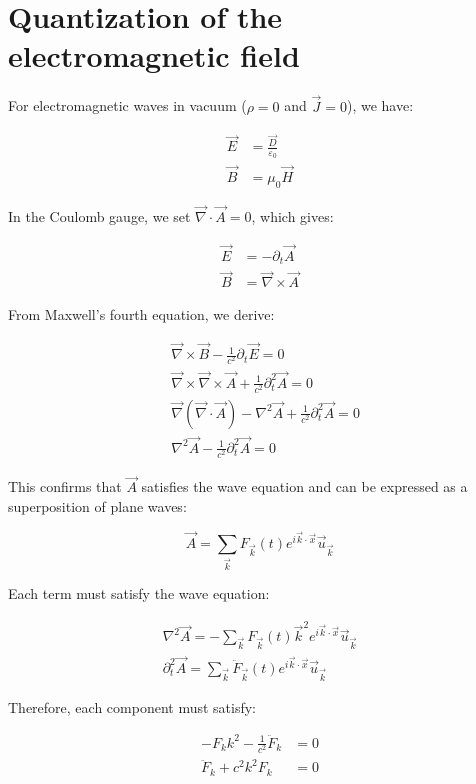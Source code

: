 \chapter{Quantization of the electromagnetic field}
For electromagnetic waves in vacuum ($\rho=0$ and $\vec{J}=0$), we have:

\begin{align}
\vec{E}&=\frac{\vec{D}}{\varepsilon_0} \\
\vec{B}&=\mu_0\vec{H}
\end{align}

In the Coulomb gauge, we set $\vec{\nabla}\cdot\vec{A}=0$, which gives:

\begin{align}
\vec{E}&=-\partial_t\vec{A}\\
\vec{B}&=\vec{\nabla}\times\vec{A}
\end{align}

From Maxwell's fourth equation, we derive:

\begin{align}
&\vec{\nabla}\times\vec{B}-\frac{1}{c^2}\partial_t\vec{E}=0\\
&\vec{\nabla}\times\vec{\nabla}\times\vec{A}+\frac{1}{c^2}\partial_t^2\vec{A}=0\\
&\vec{\nabla}(\vec{\nabla}\cdot\vec{A})-\nabla^2\vec{A}+\frac{1}{c^2}\partial_t^2\vec{A}=0 \\
&\nabla^2\vec{A}-\frac{1}{c^2}\partial_t^2\vec{A}=0
\end{align}

This confirms that $\vec{A}$ satisfies the wave equation and can be expressed as a superposition of plane waves:

\begin{equation}
\vec{A}=\sum_{\vec{k}}F_{\vec{k}}(t)e^{i\vec{k}\cdot\vec{x}}\vec{u}_{\vec{k}}
\end{equation}

Each term must satisfy the wave equation:

\[
\begin{array}{r}
\nabla^2\vec{A}=-\sum_{\vec{k}}F_{\vec{k}}(t)\vec{k}^2 e^{i\vec{k}\cdot\vec{x}}\vec{u}_{\vec{k}}\\
\partial_t^2\vec{A}=\sum_{\vec{k}}\ddot{F}_{\vec{k}}(t)e^{i\vec{k}\cdot\vec{x}}\vec{u}_{\vec{k}}
\end{array}
\]

Therefore, each component must satisfy:

\begin{align}
-F_k k^2-\frac{1}{c^2}\ddot{F}_k&=0 \\
\ddot{F}_k+c^2k^2 F_k&=0
\end{align}

